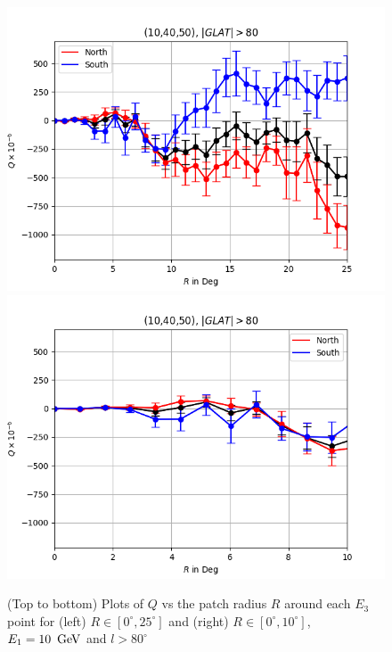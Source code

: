 \documentclass[english]{article}
\newcommand{\GeV}{\,{\rm GeV}}
\begin{document}
\begin{figure}
	\includegraphics[scale=0.5]{10_40_50_full.png}\includegraphics[scale=0.5]{10_40_50_upto_10.png}

	\caption{(Top to bottom) Plots of $Q$ vs the patch radius $R$ around each $E_3$
	point for (left) $R\in[0^{\circ},25^{\circ}]$ and (right) 
	$R\in[0^{\circ},10^{\circ}]$, $E_{1} = 10\ \GeV$ and $l>80^{\circ}$}
	\label{fig:hemisphere_lg80}
\end{figure}
\end{document}
